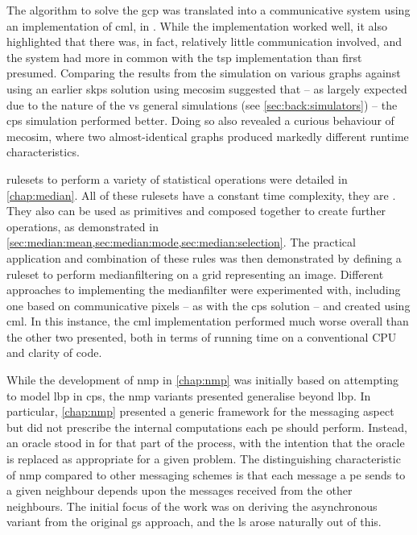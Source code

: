The algorithm to solve the \gls{gcp} was translated into a communicative system using an implementation of \gls{cml}, \hopac{} in \fsharp{}.  While the implementation worked well, it also highlighted that there was, in fact, relatively little communication involved, and the system had more in common with the \gls{tsp} implementation than first presumed.  Comparing the results from the simulation on various graphs against using an earlier \gls{skps} solution using \gls{mecosim} suggested that -- as largely expected due to the nature of the \adhoc{} vs general simulations (see \vref{sec:back:simulators}) -- the \gls{cps} simulation performed better.  Doing so also revealed a curious behaviour of \gls{mecosim}, where two almost-identical graphs produced markedly different runtime characteristics.

\Glspl{ruleset} to perform a variety of statistical operations were detailed in \cref{chap:median}.  All of these \glspl{ruleset} have a constant time complexity, \ie{} they are .  They also can be used as primitives and composed together to create further operations, as demonstrated in \eg{} \cref{sec:median:mean,sec:median:mode,sec:median:selection}.  The practical application and combination of these rules was then demonstrated by defining a \gls{ruleset} to perform \gls{medianfilter}ing on a grid representing an image.  Different approaches to implementing the \gls{medianfilter} were experimented with, including one based on communicative pixels -- as with the \gls{cps} solution -- and created using \gls{cml}.  In this instance, the \gls{cml} implementation performed much worse overall than the other two presented, both in terms of running time on a conventional CPU and clarity of code.

While the development of \gls{nmp} in \cref{chap:nmp} was initially based on attempting to model \gls{lbp} in \gls{cps}, the \gls{nmp} variants presented generalise beyond \gls{lbp}.  In particular, \cref{chap:nmp} presented a generic framework for the messaging aspect but did not prescribe the internal computations each \gls{pe} should perform.  Instead, an oracle stood in for that part of the process, with the intention that the oracle is replaced as appropriate for a given problem.  The distinguishing characteristic of \gls{nmp} compared to other messaging schemes is that each message a \gls{pe} sends to a given neighbour depends upon the messages received from the other neighbours.  The initial focus of the work was on deriving the asynchronous variant from the original \gls{gs} approach, and the \gls{ls} arose naturally out of this.

